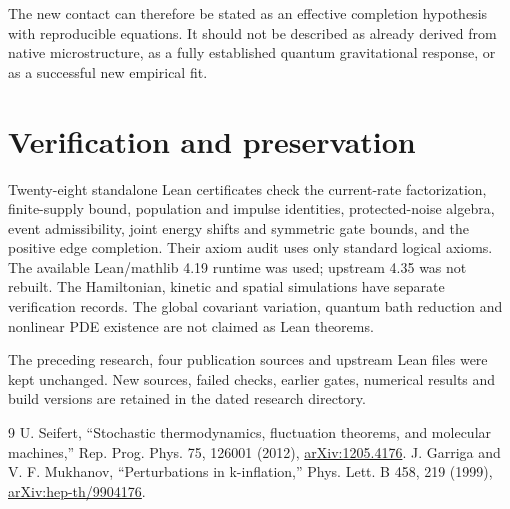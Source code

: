 \documentclass[11pt]{article}
\begin{document}
The new contact can therefore be stated as an effective completion
hypothesis with reproducible equations. It should not be described as
already derived from native microstructure, as a fully established
quantum gravitational response, or as a successful new empirical fit.

\section{Verification and preservation}
Twenty-eight standalone Lean certificates check the current-rate
factorization, finite-supply bound, population and impulse identities,
protected-noise algebra, event admissibility, joint energy shifts and
symmetric gate bounds, and the positive edge completion. Their axiom audit
uses only standard logical axioms.
The available Lean/mathlib 4.19 runtime was used; upstream 4.35 was not rebuilt.
The Hamiltonian, kinetic and spatial simulations have separate verification
records. The global covariant variation, quantum bath reduction and
nonlinear PDE existence are not claimed as Lean theorems.

The preceding research, four publication sources and upstream Lean files
were kept unchanged. New sources, failed checks, earlier gates, numerical
results and build versions are retained in the dated research directory.

\begin{thebibliography}{9}
 U. Seifert, ``Stochastic thermodynamics, fluctuation theorems,
and molecular machines,'' Rep. Prog. Phys. 75, 126001 (2012),
\href{https://arxiv.org/abs/1205.4176}{arXiv:1205.4176}.
 J. Garriga and V. F. Mukhanov, ``Perturbations in k-inflation,''
Phys. Lett. B 458, 219 (1999),
\href{https://arxiv.org/abs/hep-th/9904176}{arXiv:hep-th/9904176}.
\end{thebibliography}
\end{document}
